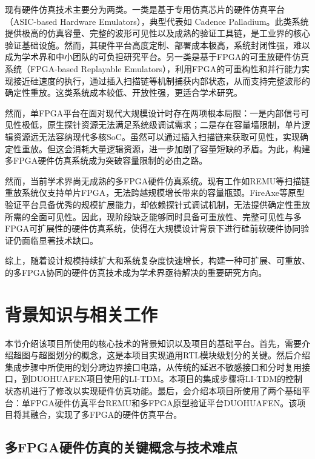 现有硬件仿真技术主要分为两类。一类是基于专用仿真芯片的硬件仿真平台（ASIC-based Hardware Emulators），典型代表如 Cadence Palladium。此类系统提供极高的仿真容量、完整的波形可见性以及成熟的验证工具链，是工业界的核心验证基础设施。然而，其硬件平台高度定制、部署成本极高，系统封闭性强，难以成为学术界和中小团队的可负担研究平台。另一类是基于FPGA的可重放硬件仿真系统（FPGA-based Replayable Emulators），利用FPGA的可重构性和并行能力实现接近硅速度的执行，通过插入扫描链等机制捕获内部状态，从而支持完整波形的确定性重放。这类系统成本较低、开放性强，更适合学术研究。

然而，单FPGA平台在面对现代大规模设计时存在两项根本局限：一是内部信号可见性极低，原生探针资源无法满足系统级调试需求；二是存在容量墙限制，单片逻辑资源远无法容纳现代多核SoC。虽然可以通过插入扫描链来获取可见性，实现确定性重放。但这会消耗大量逻辑资源，进一步加剧了容量短缺的矛盾。为此，构建多FPGA硬件仿真系统成为突破容量限制的必由之路。

然而，当前学术界尚无成熟的多FPGA硬件仿真系统。现有工作如REMU等扫描链重放系统仅支持单片FPGA，无法跨越规模增长带来的容量瓶颈。FireAxe等原型验证平台具备优秀的规模扩展能力，却依赖探针式调试机制，无法提供确定性重放所需的全面可见性\cite{whangbo_fireaxe_2024}。因此，现阶段缺乏能够同时具备可重放性、完整可见性与多FPGA可扩展性的硬件仿真系统，使得在大规模设计背景下进行硅前软硬件协同验证仍面临显著技术缺口。

综上，随着设计规模持续扩大和系统复杂度快速增长，构建一种可扩展、可重放、的多FPGA协同的硬件仿真技术成为学术界亟待解决的重要研究方向。

\section{背景知识与相关工作}

本节介绍该项目所使用的核心技术的背景知识以及项目的基础平台。首先，需要介绍超图与超图划分的概念，这是本项目实现通用RTL模块级划分的关键。然后介绍集成步骤中所使用的划分跨边界接口电路，从传统的延迟不敏感接口和分时复用接口，到DUOHUAFEN项目使用的LI-TDM。本项目的集成步骤将LI-TDM的控制状态机进行了修改以实现硬件仿真功能。最后，会介绍本项目所使用了两个基础平台：单FPGA硬件仿真平台REMU和多FPGA原型验证平台DUOHUAFEN。该项目将其融合，实现了多FPGA的硬件仿真平台。

\subsection{多FPGA硬件仿真的关键概念与技术难点}

